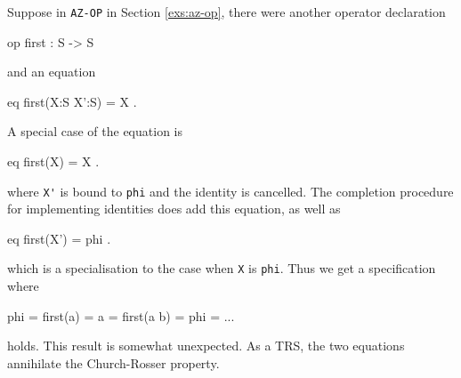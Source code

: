 \documentclass[a4paper]{memoir}
\begin{document}
Suppose in \verb|AZ-OP| in Section \ref{exs:az-op}, there were another
operator declaration
\begin{vvtm}
\begin{ccode}
  op first : S -> S
\end{ccode}
\end{vvtm}
and an equation
\begin{vvtm}
\begin{ccode}
  eq first(X:S X':S) = X .
\end{ccode}
\end{vvtm}
A special case of the equation is
\begin{vvtm}
\begin{ccode}
  eq first(X) = X .
\end{ccode}
\end{vvtm}
where \verb|X'| is bound to \verb|phi| and the identity is cancelled.
The completion procedure for implementing identities does add this
equation, as well as
\begin{vvtm}
\begin{ccode}
  eq first(X') = phi .
\end{ccode}
\end{vvtm}
which is a specialisation to the case when \verb|X| is \verb|phi|.
Thus we get a specification where
\begin{vvtm}
\begin{ccode}
  phi = first(a) = a = first(a b) = phi = ...
\end{ccode}
\end{vvtm}
holds. This result is somewhat unexpected. As a TRS, the two equations
annihilate the Church-Rosser property.
\end{document}
